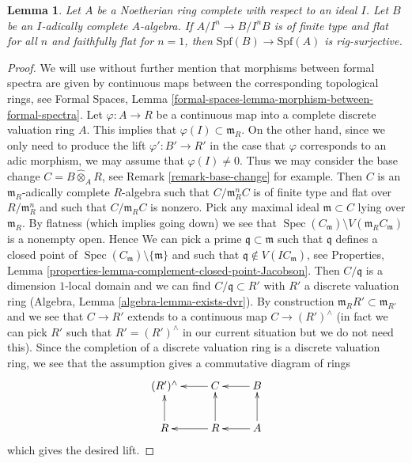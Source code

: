 \documentclass{stacks-project}
\theoremstyle{plain}
\newtheorem{lemma}[subsection]{Lemma}
\theoremstyle{definition}
\theoremstyle{remark}
\numberwithin{equation}{subsection}
\def\Spec{\mathop{\mathrm{Spec}}}
\begin{document}
\begin{lemma}
\label{lemma-faithfully-flat-rig-surjective}
Let $A$ be a Noetherian ring complete with respect to an ideal $I$.
Let $B$ be an $I$-adically complete $A$-algebra.
If $A/I^n \to B/I^nB$ is of finite type and flat for all $n$ and
faithfully flat for $n = 1$, then $\text{Spf}(B) \to \text{Spf}(A)$
is rig-surjective.
\end{lemma}

\begin{proof}
We will use without further mention that morphisms between formal spectra
are given by continuous maps between the corresponding topological rings, see
Formal Spaces, Lemma \ref{formal-spaces-lemma-morphism-between-formal-spectra}.
Let $\varphi : A \to R$ be a continuous map into a complete discrete
valuation ring $A$. This implies that $\varphi(I) \subset \mathfrak m_R$.
On the other hand, since we only need to produce the lift
$\varphi' : B' \to R'$ in the case that $\varphi$ corresponds to an adic
morphism, we may assume that $\varphi(I) \not = 0$. Thus we may consider
the base change $C = B \widehat{\otimes}_A R$, see
Remark \ref{remark-base-change} for example.
Then $C$ is an $\mathfrak m_R$-adically complete $R$-algebra
such that $C/\mathfrak m_R^n C$ is of finite type and flat over
$R/\mathfrak m_R^n$ and such that $C/\mathfrak m_R C$ is nonzero.
Pick any maximal ideal $\mathfrak m \subset C$ lying over
$\mathfrak m_R$. By flatness (which implies going down) we see that
$\Spec(C_\mathfrak m) \setminus V(\mathfrak m_R C_\mathfrak m)$
is a nonempty open. Hence
We can pick a prime $\mathfrak q \subset \mathfrak m$
such that $\mathfrak q$ defines a closed point of
$\Spec(C_\mathfrak m) \setminus \{\mathfrak m\}$ and such that
$\mathfrak q \not \in V(IC_\mathfrak m)$, see
Properties, Lemma \ref{properties-lemma-complement-closed-point-Jacobson}.
Then $C/\mathfrak q$ is a dimension $1$-local domain and we can find
$C/\mathfrak q \subset R'$ with $R'$ a discrete valuation ring
(Algebra, Lemma \ref{algebra-lemma-exists-dvr}).
By construction $\mathfrak m_R R' \subset \mathfrak m_{R'}$
and we see that $C \to R'$ extends to a continuous map
$C \to (R')^\wedge$ (in fact we can pick $R'$ such that
$R' = (R')^\wedge$ in our current situation but we do not need this).
Since the completion of a discrete valuation ring is a discrete
valuation ring, we see that the assumption gives a commutative
diagram of rings
$$
\xymatrix{
(R')^\wedge & C \ar[l] & B \ar[l] \\
R \ar[u] & R \ar[l] \ar[u] & A \ar[l] \ar[u]
}
$$
which gives the desired lift.
\end{proof}
\end{document}
